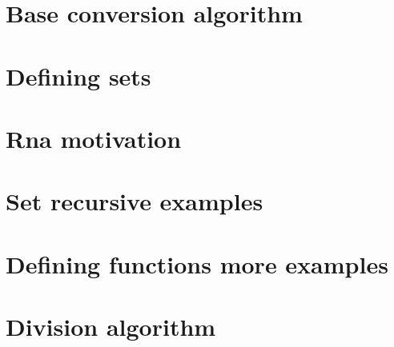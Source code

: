 \section*{Base conversion algorithm}

\vfill
\section*{Defining sets}

\vfill
\section*{Rna motivation}

\vfill
\section*{Set recursive examples}

\vfill
\section*{Defining functions more examples}

\vfill
\section*{Division algorithm}

\vfill
